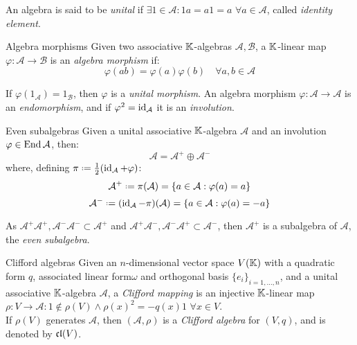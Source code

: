 An algebra is said to be \textit{unital} if $ \exists \mathit{1} \in \mathcal{A} : \mathit{1}a = a\mathit{1} = a \,\,\forall a \in \mathcal{A} $, called \textit{identity element}.

\begin{definition}{Algebra morphisms}{}
  Given two associative $ \mathbb{K} $-algebras $ \mathcal{A} , \mathcal{B} $, a $ \mathbb{K} $-linear map $ \varphi : \mathcal{A} \rightarrow \mathcal{B} $ is an \textit{algebra morphism} if:
  \begin{equation*}
    \varphi(ab) = \varphi(a) \varphi(b) \quad\forall a,b \in \mathcal{A}
  \end{equation*}
\end{definition}

If $ \varphi(\mathit{1}_\mathcal{A}) = \mathit{1}_\mathcal{B} $, then $ \varphi $ is a \textit{unital morphism}. An algebra morphism $ \varphi : \mathcal{A} \rightarrow \mathcal{A} $ is an \textit{endomorphism}, and if $ \varphi^2 = \operatorname{id}_\mathcal{A} $ it is an \textit{involution}.

\begin{proposition}{Even subalgebras}{}
  Given a unital associative $ \mathbb{K} $-algebra $ \mathcal{A} $ and an involution $ \varphi \in \operatorname{End} \mathcal{A} $, then:
  \begin{equation*}
    \mathcal{A} = \mathcal{A}^+ \oplus \mathcal{A}^-
  \end{equation*}
  where, defining $ \pi \defeq \frac{1}{2} (\id_\mathcal{A} + \varphi) $:
  \begin{equation*}
    \mathcal{A}^+ \defeq \pi(\mathcal{A}) = \{a \in \mathcal{A} : \varphi(a) = a\}
  \end{equation*}
  \begin{equation*}
    \mathcal{A}^- \defeq (\id_\mathcal{A} - \pi)(\mathcal{A}) = \{a \in \mathcal{A} : \varphi(a) = -a\}
  \end{equation*}
\end{proposition}

As $ \mathcal{A}^+ \mathcal{A}^+ , \mathcal{A}^- \mathcal{A}^- \subset \mathcal{A}^+ $ and $ \mathcal{A}^+ \mathcal{A}^- , \mathcal{A}^- \mathcal{A}^+ \subset \mathcal{A}^- $, then $ \mathcal{A}^+ $ is a subalgebra of $ \mathcal{A} $, the \textit{even subalgebra}.

\begin{definition}{Clifford algebras}{}
  Given an $ n $-dimensional vector space $ V(\mathbb{K}) $ with a quadratic form $ q $, associated linear form\footnotemark $ \omega $ and orthogonal basis $ \{e_i\}_{i = 1,\dots,n} $, and a unital associative $ \mathbb{K} $-algebra $ \mathcal{A} $, a \textit{Clifford mapping} is an injective $ \mathbb{K} $-linear map $ \rho : V \rightarrow \mathcal{A} : \mathit{1} \notin \rho(V) \land \rho(x)^2 = - q(x) \mathit{1} \,\,\forall x \in V $.\\
  If $ \rho(V) $ generates $ \mathcal{A} $, then $ (\mathcal{A},\rho) $ is a \textit{Clifford algebra} for $ (V,q) $, and is denoted by $ \mathfrak{cl}(V) $.
\end{definition}

